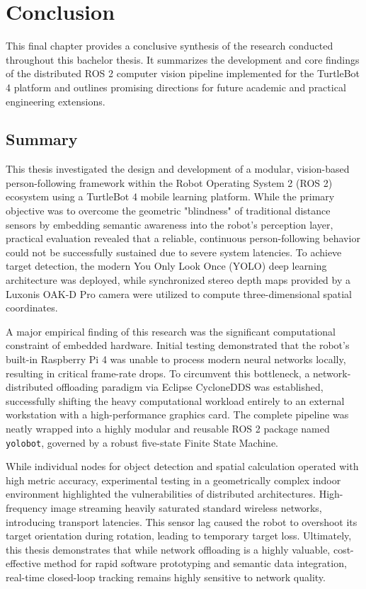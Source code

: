 \chapter{Conclusion}
This final chapter provides a conclusive synthesis of the research conducted throughout this bachelor thesis. It summarizes the development and core findings of the distributed ROS 2 computer vision pipeline implemented for the TurtleBot 4 platform and outlines promising directions for future academic and practical engineering extensions.

\section{Summary}
This thesis investigated the design and development of a modular, vision-based person-following framework within the Robot Operating System 2 (ROS 2) ecosystem using a TurtleBot 4 mobile learning platform. While the primary objective was to overcome the geometric "blindness" of traditional distance sensors by embedding semantic awareness into the robot’s perception layer, practical evaluation revealed that a reliable, continuous person-following behavior could not be successfully sustained due to severe system latencies. To achieve target detection, the modern You Only Look Once (YOLO) deep learning architecture was deployed, while synchronized stereo depth maps provided by a Luxonis OAK-D Pro camera were utilized to compute three-dimensional spatial coordinates.

A major empirical finding of this research was the significant computational constraint of embedded hardware. Initial testing demonstrated that the robot's built-in Raspberry Pi 4 was unable to process modern neural networks locally, resulting in critical frame-rate drops. To circumvent this bottleneck, a network-distributed offloading paradigm via Eclipse CycloneDDS was established, successfully shifting the heavy computational workload entirely to an external workstation with a high-performance graphics card. The complete pipeline was neatly wrapped into a highly modular and reusable ROS 2 package named \texttt{yolobot}, governed by a robust five-state Finite State Machine. 

While individual nodes for object detection and spatial calculation operated with high metric accuracy, experimental testing in a geometrically complex indoor environment highlighted the vulnerabilities of distributed architectures. High-frequency image streaming heavily saturated standard wireless networks, introducing transport latencies. This sensor lag caused the robot to overshoot its target orientation during rotation, leading to temporary target loss. Ultimately, this thesis demonstrates that while network offloading is a highly valuable, cost-effective method for rapid software prototyping and semantic data integration, real-time closed-loop tracking remains highly sensitive to network quality.

